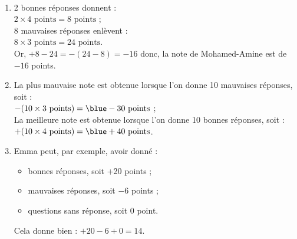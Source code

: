    \ \\ [-5mm]
   \begin{enumerate}
      \item 2 bonnes réponses donnent  : \\
         $2\times4\text{ points} =8\text{ points}$ ; \\
         8 mauvaises réponses enlèvent : \\
         $8\times3\text{ points} =24\text{ points}$. \\
         Or, $+8-24 =-(24-8) =-16$ donc, la note de Mohamed-Amine est de {\blue $-16$ points}.
      \item La plus mauvaise note est obtenue lorsque l'on donne 10 mauvaises réponses, soit : \\
         $-(10\times3\text{ points}) =\blue -30\text{ points}$ ; \\
         La meilleure note est obtenue lorsque l'on donne 10 bonnes réponses, soit  : \\
         $+(10\times4\text{ points}) =\blue +40\text{ points}$. \\
      \item Emma peut, par exemple, avoir donné :
         \begin{itemize}
            \item { bonnes réponses}, soit +20 points ;
            \item { mauvaises réponses}, soit $-6$ points ;
            \item { questions sans réponse}, soit 0 point.
         \end{itemize}
      Cela donne bien : $+20-6+0 =14$.
   \end{enumerate}
